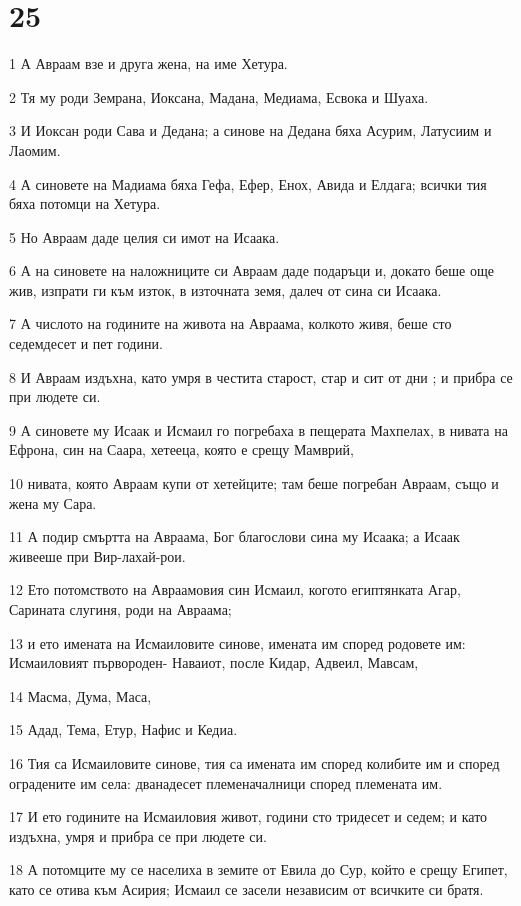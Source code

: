\chapter{25}

\par 1 А Авраам взе и друга жена, на име Хетура.
\par 2 Тя му роди Земрана, Иоксана, Мадана, Медиама, Есвока и Шуаха.
\par 3 И Иоксан роди Сава и Дедана; а синове на Дедана бяха Асурим, Латусиим и Лаомим.
\par 4 А синовете на Мадиама бяха Гефа, Ефер, Енох, Авида и Елдага; всички тия бяха потомци на Хетура.
\par 5 Но Авраам даде целия си имот на Исаака.
\par 6 А на синовете на наложниците си Авраам даде подаръци и, докато беше още жив, изпрати ги към изток, в източната земя, далеч от сина си Исаака.
\par 7 А числото на годините на живота на Авраама, колкото живя, беше сто седемдесет и пет години.
\par 8 И Авраам издъхна, като умря в честита старост, стар и сит от дни ; и прибра се при людете си.
\par 9 А синовете му Исаак и Исмаил го погребаха в пещерата Махпелах, в нивата на Ефрона, син на Саара, хетееца, която е срещу Мамврий,
\par 10 нивата, която Авраам купи от хетейците; там беше погребан Авраам, също и жена му Сара.
\par 11 А подир смъртта на Авраама, Бог благослови сина му Исаака; а Исаак живееше при Вир-лахай-рои.
\par 12 Ето потомството на Авраамовия син Исмаил, когото египтянката Агар, Сарината слугиня, роди на Авраама;
\par 13 и ето имената на Исмаиловите синове, имената им според родовете им: Исмаиловият първороден- Наваиот, после Кидар, Адвеил, Мавсам,
\par 14 Масма, Дума, Маса,
\par 15 Адад, Тема, Етур, Нафис и Кедиа.
\par 16 Тия са Исмаиловите синове, тия са имената им според колибите им и според оградените им села: дванадесет племеначалници според племената им.
\par 17 И ето годините на Исмаиловия живот, години сто тридесет и седем; и като издъхна, умря и прибра се при людете си.
\par 18 А потомците му се населиха в земите от Евила до Сур, който е срещу Египет, като се отива към Асирия; Исмаил се засели независим от всичките си братя.
